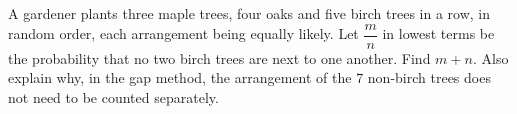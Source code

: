 A gardener plants three maple trees, four oaks and five birch trees in a row, in random order, each arrangement being equally likely. Let $\dfrac {m}{n}$ in lowest terms be the probability that no two birch trees are next to one another. Find $m+n$. Also explain why, in the gap method, the arrangement of the $7$ non-birch trees does not need to be counted separately.
